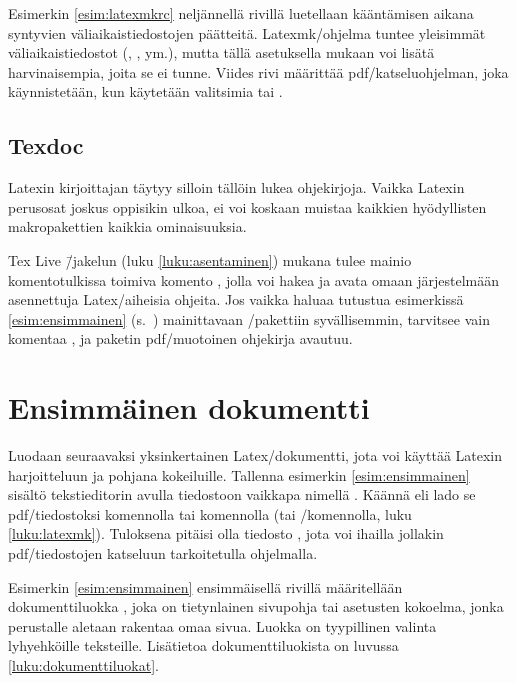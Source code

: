 

Esimerkin \ref{esim:latexmkrc} neljännellä rivillä luetellaan
kääntämisen aikana syntyvien väliaikaistiedostojen päätteitä.
Latexmk\-/ohjelma tuntee yleisimmät väliaikaistiedostot (,
,  ym.), mutta tällä asetuksella mukaan voi lisätä
harvinaisempia, joita se ei tunne. Viides rivi määrittää
pdf\-/katseluohjelman, joka käynnistetään, kun käytetään valitsimia
 tai .

\subsection{Texdoc}

Latexin kirjoittajan täytyy silloin tällöin lukea ohjekirjoja. Vaikka
Latexin perusosat joskus oppisikin ulkoa, ei voi koskaan muistaa
kaikkien hyödyllisten makropakettien kaikkia ominaisuuksia.

Tex Live \=/jakelun (luku \ref{luku:asentaminen}) mukana tulee mainio
komentotulkissa toimiva komento , jolla voi hakea ja avata
omaan järjestelmään asennettuja Latex\-/aiheisia ohjeita. Jos vaikka
haluaa tutustua esimerkissä \ref{esim:ensimmainen}
(s.~\pageref{esim:ensimmainen}) mainittavaan
\-/pakettiin syvällisemmin, tarvitsee vain komentaa
, ja paketin pdf\-/muotoinen ohjekirja avautuu.

\section{Ensimmäinen dokumentti}

Luodaan seuraavaksi yksinkertainen Latex\-/dokumentti, jota voi käyttää
Latexin harjoitteluun ja pohjana kokeiluille. Tallenna esimerkin
\ref{esim:ensimmainen} sisältö tekstieditorin avulla tiedostoon vaikkapa
nimellä . Käännä eli lado se pdf\-/tiedostoksi
komennolla  tai komennolla  (tai \-/komennolla, luku
\ref{luku:latexmk}). Tuloksena pitäisi olla tiedosto ,
jota voi ihailla jollakin pdf\-/tiedostojen katseluun tarkoitetulla
ohjelmalla.

Esimerkin \ref{esim:ensimmainen} ensimmäisellä rivillä määritellään
dokumenttiluokka , joka on tietynlainen sivupohja tai
asetusten kokoelma, jonka perustalle aletaan rakentaa omaa sivua. Luokka
 on tyypillinen valinta lyhyehköille teksteille.
Lisätietoa dokumenttiluokista on luvussa \ref{luku:dokumenttiluokat}.

